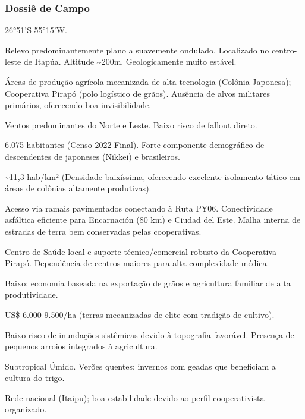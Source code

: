 \subsubsection{Dossiê de Campo}
\begin{description}[style=nextline,leftmargin=0.5cm,font=\bfseries]
\item[Coordenadas]  26°51'S 55°15'W.
\item[Topografia]  Relevo predominantemente plano a suavemente ondulado. Localizado no centro-leste de Itapúa. Altitude \textasciitilde 200m. Geologicamente muito estável.
\item[Alvos Estratégicos]  Áreas de produção agrícola mecanizada de alta tecnologia (Colônia Japonesa); Cooperativa Pirapó (polo logístico de grãos). Ausência de alvos militares primários, oferecendo boa invisibilidade.
\item[Fallout]  Ventos predominantes do Norte e Leste. Baixo risco de fallout direto.
\item[População]  6.075 habitantes (Censo 2022 Final). Forte componente demográfico de descendentes de japoneses (Nikkei) e brasileiros.
\item[Densidade]  \textasciitilde 11,3 hab/\allowbreak km² (Densidade baixíssima, oferecendo excelente isolamento tático em áreas de colônias altamente produtivas).
\item[Vias de Acesso]  Acesso via ramais pavimentados conectando à Ruta PY06. Conectividade asfáltica eficiente para Encarnación (80 km) e Ciudad del Este. Malha interna de estradas de terra bem conservadas pelas cooperativas.
\item[Serviços]  Centro de Saúde local e suporte técnico/\allowbreak comercial robusto da Cooperativa Pirapó. Dependência de centros maiores para alta complexidade médica.
\item[Custo de Vida]  Baixo; economia baseada na exportação de grãos e agricultura familiar de alta produtividade.
\item[Preço da Terra]  US\$ 6.000-9.500/\allowbreak ha (terras mecanizadas de elite com tradição de cultivo).
\item[Hidrologia]  Baixo risco de inundações sistêmicas devido à topografia favorável. Presença de pequenos arroios integrados à agricultura.
\item[Clima]  Subtropical Úmido. Verões quentes; invernos com geadas que beneficiam a cultura do trigo.
\item[Energia]  Rede nacional (Itaipu); boa estabilidade devido ao perfil cooperativista organizado.

\end{description}

